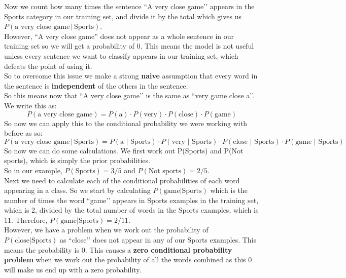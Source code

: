 \documentclass[11pt,fleqn]{book} %
\begin{document}
\noindent 
Now we count how many times the sentence ``A very close game’’ appears in the Sports category in our training set, and divide it by the total which gives us $P(\text{a very close game} \, \vert \, \text{Sports})$. \\

\noindent
However, “A very close game” does not appear as a whole sentence in our training set so we will get a probability of 0. This means the model is not useful unless every sentence we want to classify appears in our training set, which defeats the point of using it. \\

\noindent
So to overcome this issue we make a strong \textbf{naive} assumption that every word in the sentence is \textbf{independent} of the others in the sentence. \\

\noindent
So this means now that ``A very close game’’ is the same as ``very game close a’’. We write this as: \\
$$P(\text{a very close game}) = P(\text{a}) \cdot P(\text{very}) \cdot P(\text{close}) \cdot P(\text{game})$$
\noindent
So now we can apply this to the conditional probability we were working with before as so: \\
$$P(\text{a very close game} \, \vert \, \text{Sports}) = P(\text{a $\vert$ Sports}) \cdot P(\text{very $\vert$ Sports}) \cdot P(\text{close $\vert$ Sports}) \cdot P(\text{game $\vert $ Sports})$$
\noindent
So now we can do some calculations. We first work out P(Sports) and P(Not sports), which is simply the prior probabilities.\\

\noindent
So in our example, $P(\text{Sports}) = 3/5$ and $P(\text{Not sports}) = 2/5$. \\

\noindent
Next we need to calculate each of the conditional probabilities of each word appearing in a class. So we start by calculating $P(\text{game} \vert \text{Sports})$ which is the number of times the word ``game’’ appears in Sports examples in the training set, which is 2, divided by the total number of words in the Sports examples, which is 11. Therefore, $P(\text{game} \vert \text{Sports}) = 2/11$. \\

\noindent
However, we have a problem when we work out the probability of $P(\text{close} \vert \text{Sports})$ as ``close’’ does not appear in any of our Sports examples. This means the probability is 0. This causes a \textbf{zero conditional probability problem} when we work out the probability of all the words combined as this 0 will make us end up with a zero probability.\\
\end{document}

